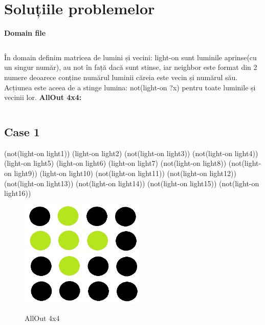 \section{Soluțiile problemelor}
\textbf{Domain file}\newline\newline

\inputminted[linenos]{python}{code/all-out.pddl}

\newline
În domain definim matricea de lumini și vecini:
light-on sunt luminile aprinse(cu un singur număr), au not în față dacă sunt stinse, iar neighbor este format din 2 numere deoarece conține numărul luminii căreia este vecin și numărul său.
Acțiunea este aceea de a stinge lumina: not(light-on ?x) pentru toate luminile și vecinii lor.
\newline\pagebreak
\newpage
\textbf{AllOut 4x4:}\newline\newline
\inputminted[linenos]{python}{code/all-out-p02.pddl}
\newline\newline
\newline\pagebreak
 \subsection{Case 1}
 \newline
 \newline
(not(light-on light1))  
(light-on light2)  
(not(light-on light3))  
(not(light-on light4))
\newline
(light-on light5)  
(light-on light6)  
(light-on light7)  
(not(light-on light8))
\newline
(not(light-on light9)) 
(light-on light10) 
(not(light-on light11)) 
(not(light-on light12))
\newline
(not(light-on light13)) 
(not(light-on light14)) 
(not(light-on light15)) 
(not(light-on light16))
\newline
\newline
\begin{figure}[h]
\centering
\includegraphics[width=6cm]{text/images/pic3.jpeg}\\
\newline
\caption{AllOut 4x4}
\end{figure} \newline \newline

